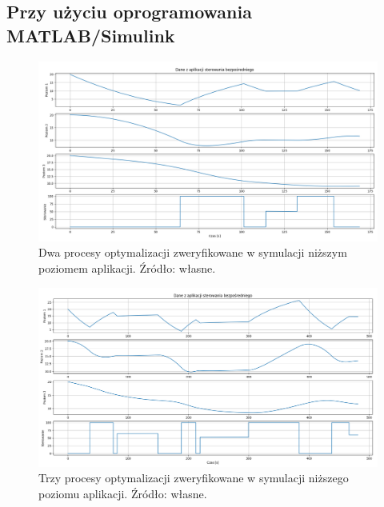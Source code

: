 \subsection{Przy użyciu oprogramowania MATLAB/Simulink}
\label{sub:sym-wer-matlab}


\begin{figure}
    \centering
    \includegraphics[scale=0.5,angle=90]{Grafika/ext_ctrl_2_opts}
    \caption{Dwa procesy optymalizacji zweryfikowane w symulacji niższym poziomem aplikacji. Źródło: własne.}
    \label{fig:extctrl2opts}
\end{figure}

\begin{figure}
    \centering
    \includegraphics[scale=0.5,angle=90]{Grafika/ext_ctrl_3_opts}
    \caption{Trzy procesy optymalizacji zweryfikowane w symulacji niższego poziomu aplikacji. Źródło: własne.}
    \label{fig:extctrl3opts}
\end{figure}

